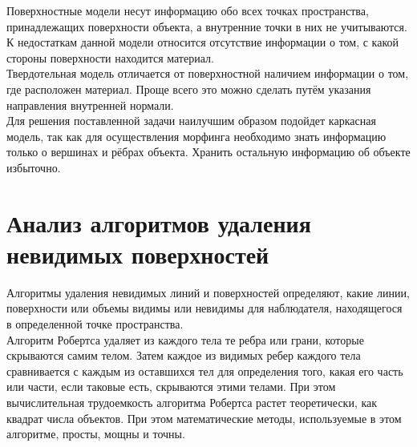 Поверхностные модели несут информацию обо всех точках
пространства, принадлежащих поверхности объекта, а внутренние точки в них
не учитываются. К недостаткам данной модели относится отсутствие информации о том, с какой стороны поверхности находится материал.\\ %


Твердотельная модель отличается от поверхностной наличием информации о том, где расположен материал. Проще всего это можно сделать путём указания направления внутренней нормали.\cite{Kosnikov}\\


Для решения поставленной задачи наилучшим образом подойдет каркасная модель, так как для осуществления морфинга необходимо знать информацию только о вершинах и рёбрах объекта. Хранить остальную информацию об объекте избыточно. 

\newpage

\section{Анализ алгоритмов удаления невидимых поверхностей}

Алгоритмы удаления невидимых линий и поверхностей определяют, какие линии, поверхности или объемы видимы или невидимы для наблюдателя, находящегося в определенной точке пространства.\\


Алгоритм Робертса удаляет из каждого тела те ребра или грани, которые скрываются самим телом. Затем каждое из видимых ребер каждого тела сравнивается с каждым из оставшихся тел для определения того, какая его часть или части, если таковые есть, скрываются этими телами. При этом вычислительная трудоемкость алгоритма Робертса растет теоретически, как квадрат числа объектов. При этом математические методы, используемые в этом алгоритме, просты, мощны и точны.\\ %

